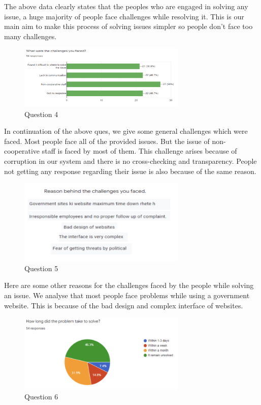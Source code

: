 \documentclass[acmtog]{acmart}
\begin{document}
The above data clearly states that the peoples who are engaged in solving any issue, a huge majority of people face challenges while resolving it. This is our main aim to make this process of solving issues simpler so people don’t face too many challenges.


\begin{figure}[H]
    \includegraphics[width=8cm]{Resources/q4}
    \caption{Question 4}
    \label{fig:q4}
\end{figure}

In continuation of the above ques, we give some general challenges which were faced. Most people face all of the provided issues. But the issue of non-cooperative staff is faced by most of them. This challenge arises because of corruption in our system and there is no cross-checking and transparency. People not getting any response regarding their issue is also because of the same reason.

\begin{figure}[H]
    \includegraphics[width=8cm]{Resources/q5}
    \caption{Question 5}
    \label{fig:q5}
\end{figure}

Here are some other reasons for the challenges faced by the people while solving an issue. We analyse that most people face problems while using a government website. This is because of the bad design and complex interface of websites. 

\begin{figure}[H]
    \includegraphics[width=8cm]{Resources/q6}
    \caption{Question 6}
    \label{fig:q6}
\end{figure}
\end{document}
